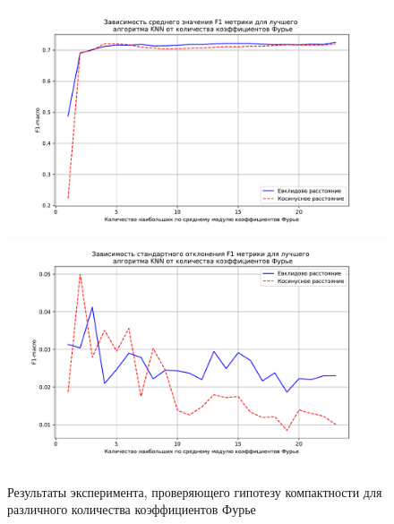 \documentclass{article}
\begin{document}
\begin{figure}
    \centering
    \includegraphics[width=0.49\linewidth]{img/mean.pdf}
    \includegraphics[width=0.49\linewidth]{img/std.pdf}
    \caption{Результаты эксперимента, проверяющего гипотезу компактности для различного количества коэффициентов Фурье}
    \label{fig:classification}
\end{figure}
\end{document}
